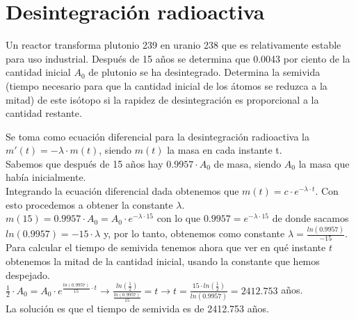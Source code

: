 

\section{Desintegración radioactiva}
\begin{ejer}
	Un reactor transforma plutonio 239 en uranio 238 que es relativamente estable para
	uso industrial. Después de 15 años se determina que 0.0043 por ciento de la cantidad
	inicial $A_0$ de plutonio se ha desintegrado. Determina la semivida (tiempo necesario
	para que la cantidad inicial de los átomos se reduzca a la mitad) de este isótopo si
	la rapidez de desintegración es proporcional a la cantidad restante.
\end{ejer}
\begin{sol}
	Se toma como ecuación diferencial para la desintegración radioactiva la $m'(t)=-\lambda \cdot m(t)$, siendo $m(t)$ la masa en cada instante t.\\ 
	Sabemos que después de 15 años hay $0.9957 \cdot A_0$ de masa, siendo $A_0$ la masa que había inicialmente.\\
	Integrando la ecuación diferencial dada obtenemos que $m(t) = c\cdot e^{-\lambda \cdot t}$. Con esto procedemos a obtener la constante $\lambda$.\\  
	$m(15) = 0.9957\cdot A_0 = A_0\cdot e^{-\lambda \cdot 15}$ con lo que $0.9957 = e^{-\lambda \cdot 15}$ de donde sacamos $ln(0.9957) = -15\cdot \lambda$ y, por lo tanto, obtenemos como constante $\lambda = \frac{ln(0.9957)}{-15}$.\\ 
	Para calcular el tiempo de semivida tenemos ahora que ver en qué instante $t$ obtenemos la mitad de la cantidad inicial, usando la constante que hemos despejado.\\  
	$\frac{1}{2}\cdot A_0 = A_0\cdot e^{\frac{ln(0.9957)}{15}\cdot t} \rightarrow \frac{ln(\frac{1}{2})}{\frac{ln(0.9957)}{15}}=t \rightarrow t = \frac{15\cdot ln(\frac{1}{2})}{ln(0.9957)} = 2412.753$ años.\\
	La solución es que el tiempo de semivida es de 2412.753 años.
\end{sol}

